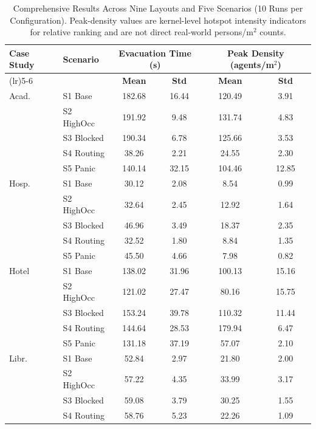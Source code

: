 \documentclass[nolineno]{ieeeaccess}
\begin{document}
\begin{table}[t]
\centering
\caption{Comprehensive Results Across Nine Layouts and Five Scenarios (10 Runs per Configuration). Peak-density values are kernel-level hotspot intensity indicators for relative ranking and are not direct real-world persons/m$^2$ counts.}
\label{tab:results_main}
{\scriptsize
\setlength{\tabcolsep}{2.5pt}
\renewcommand{\arraystretch}{0.94}
\begin{tabular}{>{\raggedright\arraybackslash}p{1.15cm}>{\raggedright\arraybackslash}p{1.30cm}cccc}
\toprule
\textbf{Case Study} & \textbf{Scenario} & \multicolumn{2}{c}{\textbf{Evacuation Time (s)}} & \multicolumn{2}{c}{\textbf{Peak Density (agents/m$^2$)}} \\
\cmidrule(lr){3-4} \cmidrule(lr){5-6}
& & \textbf{Mean} & \textbf{Std} & \textbf{Mean} & \textbf{Std} \\
\midrule
Acad. & S1 Base & 182.68 & 16.44 & 120.49 & 3.91 \\
 & S2 HighOcc & 191.92 & 9.48 & 131.74 & 4.83 \\
 & S3 Blocked & 190.34 & 6.78 & 125.66 & 3.53 \\
 & S4 Routing & 38.26 & 2.21 & 24.55 & 2.30 \\
 & S5 Panic & 140.14 & 32.15 & 104.46 & 12.85 \\
\midrule
Hosp. & S1 Base & 30.12 & 2.08 & 8.54 & 0.99 \\
 & S2 HighOcc & 32.64 & 2.45 & 12.92 & 1.64 \\
 & S3 Blocked & 46.96 & 3.49 & 18.37 & 2.35 \\
 & S4 Routing & 32.52 & 1.80 & 8.84 & 1.35 \\
 & S5 Panic & 45.50 & 4.66 & 7.98 & 0.82 \\
\midrule
Hotel & S1 Base & 138.02 & 31.96 & 100.13 & 15.16 \\
 & S2 HighOcc & 121.02 & 27.47 & 80.16 & 15.75 \\
 & S3 Blocked & 153.24 & 39.78 & 110.32 & 11.44 \\
 & S4 Routing & 144.64 & 28.53 & 179.94 & 6.47 \\
 & S5 Panic & 131.18 & 37.19 & 57.07 & 2.10 \\
\midrule
Libr. & S1 Base & 52.84 & 2.97 & 21.80 & 2.00 \\
 & S2 HighOcc & 57.22 & 4.35 & 33.99 & 3.17 \\
 & S3 Blocked & 59.08 & 3.79 & 30.25 & 1.55 \\
 & S4 Routing & 58.76 & 5.23 & 22.26 & 1.09 \\

\end{tabular}}
\end{table}
\end{document}
